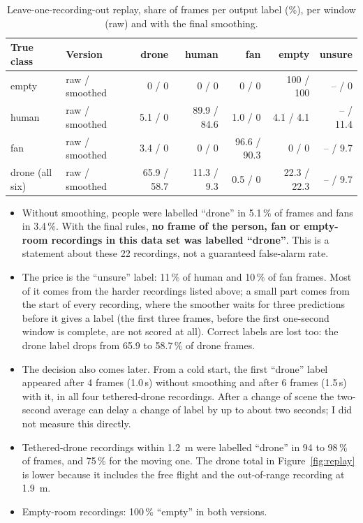 \documentclass[11pt,a4paper]{article}
\begin{document}
\begin{table}[h]\centering\small
\caption{Leave-one-recording-out replay, share of frames per output label (\%), per window (raw) and with the final smoothing.}\label{tab:replay}
\begin{tabular}{@{}llrrrrr@{}}\toprule
True class & Version & drone & human & fan & empty & unsure\\\midrule
empty & raw / smoothed & 0 / 0 & 0 / 0 & 0 / 0 & 100 / 100 & -- / 0\\
human & raw / smoothed & 5.1 / 0 & 89.9 / 84.6 & 1.0 / 0 & 4.1 / 4.1 & -- / 11.4\\
fan & raw / smoothed & 3.4 / 0 & 0 / 0 & 96.6 / 90.3 & 0 / 0 & -- / 9.7\\
drone (all six) & raw / smoothed & 65.9 / 58.7 & 11.3 / 9.3 & 0.5 / 0 & 22.3 / 22.3 & -- / 9.7\\\bottomrule
\end{tabular}\end{table}
\begin{itemize}
\item Without smoothing, people were labelled ``drone'' in 5.1\,\% of frames and fans in 3.4\,\%. With the final rules, \textbf{no frame of the person, fan or empty-room recordings in this data set was labelled ``drone''}. This is a statement about these 22 recordings, not a guaranteed false-alarm rate.
\item The price is the ``unsure'' label: 11\,\% of human and 10\,\% of fan frames. Most of it comes from the harder recordings listed above; a small part comes from the start of every recording, where the smoother waits for three predictions before it gives a label (the first three frames, before the first one-second window is complete, are not scored at all). Correct labels are lost too: the drone label drops from 65.9 to 58.7\,\% of drone frames.
\item The decision also comes later. From a cold start, the first ``drone'' label appeared after 4 frames (1.0\,s) without smoothing and after 6 frames (1.5\,s) with it, in all four tethered-drone recordings. After a change of scene the two-second average can delay a change of label by up to about two seconds; I did not measure this directly.
\item Tethered-drone recordings within \SI{1.2}{m} were labelled ``drone'' in 94 to 98\,\% of frames, and 75\,\% for the moving one. The drone total in Figure~\ref{fig:replay} is lower because it includes the free flight and the out-of-range recording at \SI{1.9}{m}.
\item Empty-room recordings: 100\,\% ``empty'' in both versions.
\end{itemize}
\end{document}

